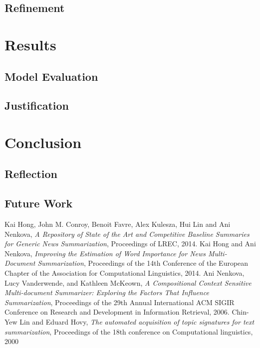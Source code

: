 \documentclass{article}
\begin{document}
\subsection{Refinement}

\section{Results}
\subsection{Model Evaluation}
\subsection{Justification}

\section{Conclusion}
\subsection{Reflection}
\subsection{Future Work}

\begin{thebibliography}{99}
    Kai Hong, John M. Conroy, Benoit Favre, Alex Kulesza, Hui Lin and Ani Nenkova,
    \emph{A Repository of State of the Art and Competitive Baseline Summaries for Generic News Summarization},
    Proceedings of LREC, 2014.
    Kai Hong and Ani Nenkova,
    \emph{Improving the Estimation of Word Importance for News Multi-Document Summarization},
    Proceedings of the 14th Conference of the European Chapter of the Association for Computational Linguistics, 2014.
    Ani Nenkova, Lucy Vanderwende, and Kathleen McKeown,
    \emph{A Compositional Context Sensitive Multi-document Summarizer: Exploring the Factors That Influence Summarization},
    Proceedings of the 29th Annual International ACM SIGIR Conference on Research and Development in Information Retrieval, 2006.
    Chin-Yew Lin and Eduard Hovy,
    \emph{The automated acquisition of topic signatures for text summarization},
    Proceedings of the 18th conference on Computational linguistics,
    2000
\end{thebibliography}
\end{document}
